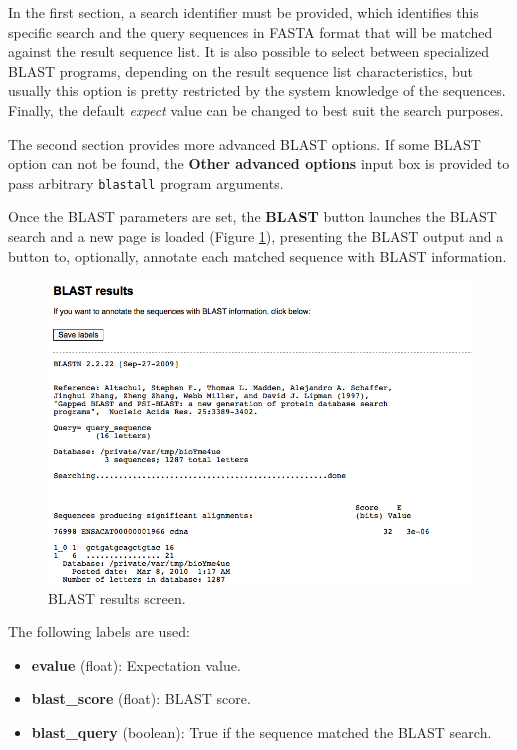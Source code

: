 In the first section, a search identifier must be provided, which identifies
this specific search and the query sequences in FASTA format that will be
matched against the result sequence list. It is also possible to
select between specialized BLAST programs, depending on the result sequence list
characteristics, but usually this option is pretty restricted by the system knowledge of
the sequences. Finally, the default \textit{expect} value can be changed to best
suit the search purposes.

The second section provides more advanced BLAST options.
If some BLAST option can not be found, the \textbf{Other advanced options} input box
is provided to pass arbitrary \texttt{blastall} program arguments.

Once the BLAST parameters are set, the \textbf{BLAST} button launches the BLAST
search and a new page is loaded (Figure \ref{fig:blast_results2}), presenting the BLAST output and a button to,
optionally, annotate each matched sequence with BLAST information.

\begin{figure}[ht]
  \centering
    \includegraphics[scale=0.45]{blast_results.png}
  \caption{BLAST results screen.}
  \label{fig:blast_results2}
\end{figure}

The following labels are used:

\begin{itemize}
  \item \textbf{evalue} (float): Expectation value.
  \item \textbf{blast\_score} (float): BLAST score.
  \item \textbf{blast\_query} (boolean): True if the sequence matched the BLAST search.
\end{itemize}

